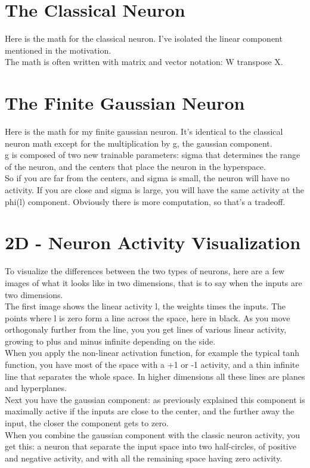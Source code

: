 \documentclass{article}
\begin{document}
\section{The Classical Neuron}
Here is the math for the classical neuron. I've isolated the linear component mentioned in the motivation.\\
The math is often written with matrix and vector notation: W transpose X.

\section{The Finite Gaussian Neuron}
Here is the math for my finite gaussian neuron. It's identical to the classical neuron math except for the multiplication by g, the gaussian component.\\
g is composed of two new trainable parameters: sigma that determines the range of the neuron, and the centers that place the neuron in the hyperspace.\\
So if you are far from the centers, and sigma is small, the neuron will have no activity. If you are close and sigma is large, you will have the same activity at the phi(l) component.
Obviously there is more computation, so that's a tradeoff.

\section{2D - Neuron Activity Visualization}
To visualize the differences between the two types of neurons, here are a few images of what it looks like in two dimensions, that is to say when the inputs are two dimensions.\\
The first image shows the linear activity l, the weights times the inputs. The points where l is zero form a line across the space, here in black. As you move orthogonaly further from the line, you you get lines of various linear activity, growing to plus and minus infinite depending on the side.\\
When you apply the non-linear activation function, for example the typical tanh function, you have most of the space with a +1 or -1 activity, and a thin infinite line that separates the whole space. In higher dimensions all these lines are planes and hyperplanes.\\
Next you have the gaussian component: as previously explained this component is maximally active if the inputs are close to the center, and the further away the input, the closer the component gets to zero.\\
When you combine the gaussian component with the classic neuron activity, you get this: a neuron that separate the input space into two half-circles, of positive and negative activity, and with all the remaining space having zero activity.\\
\end{document}

